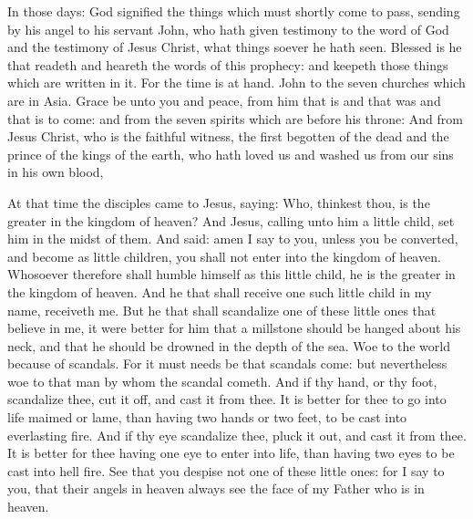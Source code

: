 




In those days: God signified the things which must shortly come to pass,
sending by his angel to his servant John,
who hath given testimony to the word of God and the testimony of
Jesus Christ, what things soever he hath seen.
Blessed is he that readeth and heareth the words of this prophecy:
and keepeth those things which are written in it. For the time is at
hand.
John to the seven churches which are in Asia. Grace be unto you and
peace, from him that is and that was and that is to come: and from the
seven spirits which are before his throne:
And from Jesus Christ, who is the faithful witness, the first
begotten of the dead and the prince of the kings of the earth, who hath
loved us and washed us from our sins in his own blood,



At that time the disciples came to Jesus, saying: Who, thinkest
thou, is the greater in the kingdom of heaven?
And Jesus, calling unto him a little child, set him in the midst
of them.
And said: amen I say to you, unless you be converted, and become
as little children, you shall not enter into the kingdom of heaven.
Whosoever therefore shall humble himself as this little child, he
is the greater in the kingdom of heaven.
And he that shall receive one such little child in my name,
receiveth me.
But he that shall scandalize one of these little ones that believe
in me, it were better for him that a millstone should be hanged about
his neck, and that he should be drowned in the depth of the sea.
Woe to the world because of scandals. For it must needs be that
scandals come: but nevertheless woe to that man by whom the scandal
cometh.
And if thy hand, or thy foot, scandalize thee, cut it off, and
cast it from thee. It is better for thee to go into life maimed or lame,
than having two hands or two feet, to be cast into everlasting fire.
And if thy eye scandalize thee, pluck it out, and cast it from
thee. It is better for thee having one eye to enter into life, than
having two eyes to be cast into hell fire.
See that you despise not one of these little ones: for I say to
you, that their angels in heaven always see the face of my Father who is
in heaven.



